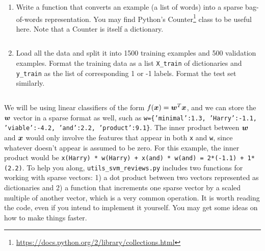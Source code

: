 \documentclass{article}
\newcommand{\code}[1]{\texttt{#1}}
\theoremstyle{plain}
\theoremstyle{definition}
\begin{document}
\begin{enumerate}
  \setcounter{enumi}{\value{saveenum}}
\item Write a function that converts an example (a list of words) into
a sparse bag-of-words representation. You may find Python's Counter\footnote{\url{https://docs.python.org/2/library/collections.html}}
class to be useful here. Note that a Counter is itself a dictionary.
\begin{itemize}
    \color{blue}
      \inputminted[firstline=14, lastline=19, breaklines=True]{python}{hw_3.py}
\end{itemize}


\item Load all the data and split it into 1500 training examples
and 500 validation examples. Format the training data as a list \code{X\_train} of dictionaries and \code{y\_train} as the list of corresponding 1 or -1 labels. Format the test set similarly.
\begin{itemize}
    \color{blue}
      \inputminted[firstline=100, lastline=115, breaklines=True]{python}{hw_3.py}
\end{itemize}


\setcounter{saveenum}{\value{enumi}}
\end{enumerate}




We will be using linear classifiers of the form $f(\boldsymbol{x})=\boldsymbol{w}^{T} \boldsymbol{x}$, and
we can store the $\boldsymbol{w}$ vector in a sparse format as well, such as \code{w=\{'minimal':1.3, 'Harry':-1.1, 'viable':-4.2, 'and':2.2, 'product':9.1\}}.
The inner product between $\boldsymbol{w}$ and $\boldsymbol{x}$ would only involve the features
that appear in both \code{x} and \code{w}, since whatever doesn't
appear is assumed to be zero. For this example, the inner product
would be \code{x(Harry) {*} w(Harry) + x(and) {*} w(and) = 2{*}(-1.1)
+ 1{*}(2.2)}. To help you along, \code{utils\_svm\_reviews.py} includes two functions for working with
sparse vectors: 1) a dot product between two vectors represented as
dictionaries and 2) a function that increments one sparse vector by a scaled
multiple of another vector, which is a very common operation. It is
worth reading the code, even if you intend to implement it yourself.
You may get some ideas on how to make things faster. 
\end{document}
